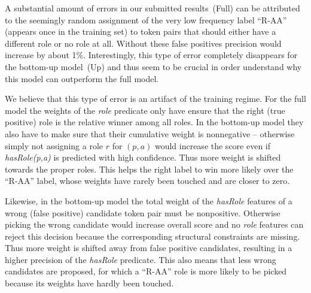 


A substantial amount of errors in our submitted results~(Full) can be attributed to the seemingly random assignment of the very low frequency label ``R-AA'' (appears once in the training set) to token pairs that should either have a different role or no role at all. Without these false positives precision would increase by about 1\%. Interestingly, this type of error completely disappears for the bottom-up model~(Up) and thus seem to be crucial in order understand why this model can outperform the full model. 

We believe that this type of error is an artifact of the training regime. For the full model the weights of the \emph{role} predicate only have ensure that the right (true positive) role is the relative winner among all roles. In the bottom-up model they also have to make sure that their cumulative weight is nonnegative -- otherwise simply not assigning a role $r$ for $(p,a)$ would increase the score even if \emph{hasRole(p,a)} is predicted with high confidence. Thus more weight is shifted towards the proper roles. This helps the right label to win more likely over the ``R-AA'' label, whose weights have rarely been touched and are closer to zero.

Likewise, in the bottom-up model the total weight of the \emph{hasRole} features of a wrong (false positive) candidate token pair must be nonpositive. Otherwise picking the wrong candidate would increase overall score and no \emph{role} features can reject this decision because the corresponding structural constraints are missing. Thus more weight is shifted away from false positive candidates, resulting in a higher precision of the \emph{hasRole} predicate. This also means that less wrong candidates are proposed, for which a ``R-AA'' role is more likely to be picked because its weights have hardly been touched.


